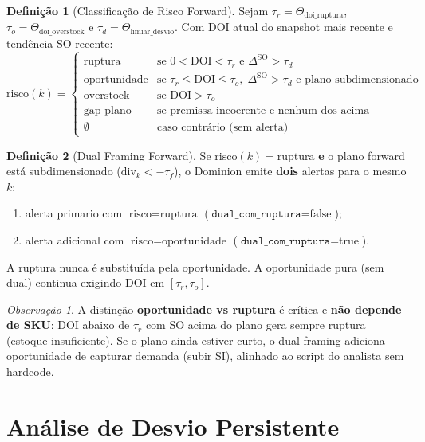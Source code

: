 \documentclass[a4paper, 12pt]{report}
\theoremstyle{definition}
\newtheorem{definicao}{Defini\c{c}\~ao}[chapter]
\theoremstyle{remark}
\newtheorem{observacao}{Observa\c{c}\~ao}[chapter]
\begin{document}
\begin{definicao}[Classifica\c{c}\~ao de Risco Forward]
  Sejam $\tau_r = \Theta_{\text{doi\_ruptura}}$, $\tau_o = \Theta_{\text{doi\_overstock}}$
  e $\tau_d = \Theta_{\text{limiar\_desvio}}$. Com DOI atual do snapshot
  mais recente e tend\^encia SO recente:
  \[
    \text{risco}(k) = \begin{cases}
      \text{ruptura} & \text{se } 0 < \text{DOI} < \tau_r
        \text{ e } \Delta^{\text{SO}} > \tau_d \\
      \text{oportunidade} & \text{se } \tau_r \leq \text{DOI} \leq \tau_o,\;
        \Delta^{\text{SO}} > \tau_d \text{ e plano subdimensionado} \\
      \text{overstock} & \text{se DOI} > \tau_o \\
      \text{gap\_plano} & \text{se premissa incoerente e nenhum dos acima} \\
      \emptyset & \text{caso contr\'ario (sem alerta)}
    \end{cases}
  \]
\end{definicao}

\begin{definicao}[Dual Framing Forward]
  Se $\text{risco}(k)=\text{ruptura}$ \textbf{e} o plano forward est\'a
  subdimensionado ($\text{div}_k < -\tau_f$), o Dominion emite
  \textbf{dois} alertas para o mesmo $k$:
  \begin{enumerate}
    \item alerta primario com $\text{risco}=\text{ruptura}$
      ($\texttt{dual\_com\_ruptura}=\text{false}$);
    \item alerta adicional com $\text{risco}=\text{oportunidade}$
      ($\texttt{dual\_com\_ruptura}=\text{true}$).
  \end{enumerate}
  A ruptura nunca \'e substitu\'ida pela oportunidade. A oportunidade
  pura (sem dual) continua exigindo DOI em $[\tau_r,\tau_o]$.
\end{definicao}

\begin{observacao}
  A distin\c{c}\~ao \textbf{oportunidade vs ruptura} \'e cr\'itica e
  \textbf{n\~ao depende de SKU}: DOI abaixo de $\tau_r$ com SO acima do
  plano gera sempre ruptura (estoque insuficiente). Se o plano ainda
  estiver curto, o dual framing adiciona oportunidade de capturar
  demanda (subir SI), alinhado ao script do analista sem hardcode.
\end{observacao}


\section{An\'alise de Desvio Persistente}
\end{document}
